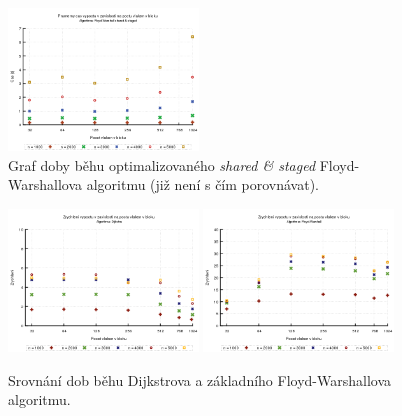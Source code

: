 \begin{figure}
    \centering
    \includegraphics[width=0.45\textwidth]{../grafy/03_cuda/03-01-Floyd_v2_cas_zoom}
    \caption{Graf doby běhu optimalizovaného \emph{shared \& staged} Floyd-Warshallova algoritmu (již není s čím porovnávat).}
    \label{f:mer:cuda:cas3}
\end{figure}

\begin{figure}
    \centering
    \includegraphics[width=0.45\textwidth]{../grafy/03_cuda/03-02-Dijkstra_zrychleni}
    \includegraphics[width=0.45\textwidth]{../grafy/03_cuda/03-02-Floyd_v1_zrychleni}
    \caption{Srovnání dob běhu Dijkstrova a základního Floyd-Warshallova algoritmu.}
    \label{f:mer:cuda:zrychleni1}
\end{figure}

